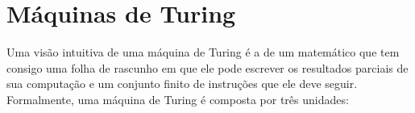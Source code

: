





\section{Máquinas de Turing} \label{MT}


Uma visão intuitiva de uma máquina de Turing é a de um matemático que tem consigo uma folha de rascunho em que ele pode escrever os resultados parciais de sua computação e um conjunto finito de instruções que ele deve seguir. Formalmente, uma máquina de Turing é composta por três unidades:

